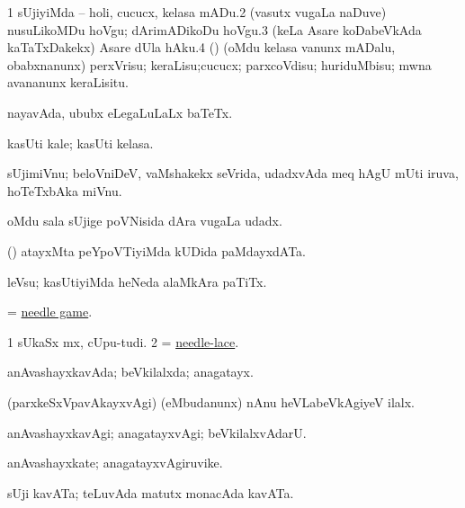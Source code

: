 \bentry
{}
\gl{\sakirx}
\num{1} {sUjiyiMda -- holi, cucucx, kelasa mADu.\num{2} (vasutx \mo vugaLa naDuve) nusuLikoMDu hoVgu; dArimADikoDu hoVgu.\num{3} (keLa Asare koDabeVkAda kaTaTxDakekx) Asare dUla hAku.\num{4} (\AmA) (oMdu kelasa \mo vanunx mADalu, obabxnanunx) perxVrisu; keraLisu;cucucx; parxcoVdisu; huriduMbisu;  mwna avananunx keraLisitu.}\eentry

\bentry
{}
\gl{\nA}
\bmng
nayavAda, ububx eLegaLuLaLx baTeTx. 
\emng
\eentry

\bentry
{}
\gl{\nA}
\bmng
kasUti kale; kasUti kelasa. 
\emng
\eentry

\bentry
{}
\gl{\nA}
\bmng
sUjimiVnu; beloVniDeV, vaMshakekx seVrida, udadxvAda meq hAgU mUti iruva, hoTeTxbAka miVnu. 
\emng
\eentry

\bentry
{}
\gl{\nA}
\bmng
oMdu sala sUjige poVNisida dAra \mo vugaLa udadx. 
\emng
\eentry

\bentry
{}
\gl{\nA}
\bmng
(\birx) atayxMta peYpoVTiyiMda kUDida paMdayxdATa. 
\emng
\eentry

\bentry
{}
\gl{\nA}
\bmng
leVsu; kasUtiyiMda heNeda alaMkAra paTiTx. 
\emng
\eentry

\bentry
{}
\gl{\nA}
\bmng
= \hyperlink{needle game}{needle game}.
\emng
\eentry

\bentry
{}
\gl{\nA}
\bmng
\bnum
\num{1} sUkaSx mx, cUpu-tudi. 
\num{2} = \hyperlink{needle-lace}{needle-lace}. 
\enum
\emng
\eentry

\bentry
{}
\gl{\gu}
\bmng
anAvashayxkavAda; beVkilalxda; anagatayx. 
\emng

\noindent
\gl{\pagu}
\bmng
{} (parxkeSxVpavAkayxvAgi) (eMbudanunx) nAnu heVLabeVkAgiyeV ilalx. 
\emng
\eentry

\bentry
{}
\gl{\kirxvi}
\bmng
anAvashayxkavAgi; anagatayxvAgi; beVkilalxvAdarU. 
\emng
\eentry

\bentry
{}
\gl{\nA}
\bmng
anAvashayxkate; anagatayxvAgiruvike. 
\emng
\eentry

\bentry
{}
\gl{\nA}
\bmng
sUji kavATa; teLuvAda matutx monacAda kavATa. 
\emng
\eentry

